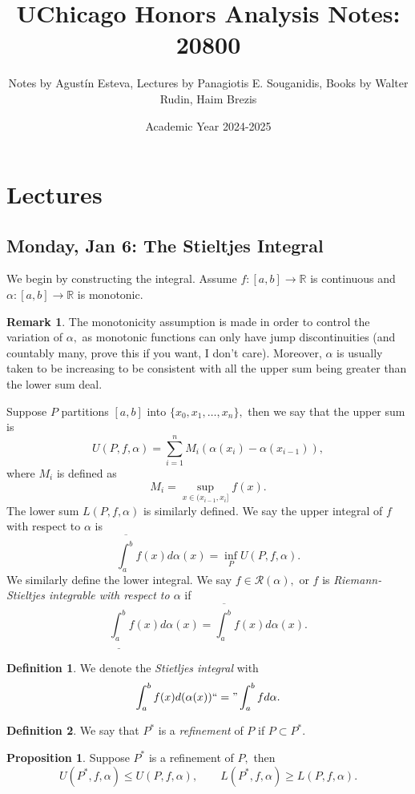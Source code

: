 \documentclass[10pt, oneside]{article}
\title{UChicago Honors Analysis Notes: 20800}
\author{Notes by Agustín Esteva, Lectures by Panagiotis E. Souganidis, Books by Walter Rudin, Haim Brezis}
\date{Academic Year 2024-2025}
\newcommand{\bbR}{\mathbb{R}}
\theoremstyle{definition}
\newtheorem{defn}{Definition}
\newtheorem{prop}{Proposition}
\newtheorem{rem}{Remark}
\begin{document}
\maketitle
\tableofcontents

\vspace{.25in}


\newpage
\section{Lectures}

\subsection{Monday, Jan 6: The Stieltjes Integral}
We begin by constructing the integral. Assume $f: [a,b]\to \bbR$ is continuous and $\alpha: [a,b]\to \bbR$ is monotonic. 
\begin{rem}
    The monotonicity assumption is made in order to control the variation of $\alpha,$ as monotonic functions can only have jump discontinuities (and countably many, prove this if you want, I don't care). Moreover, $\alpha$ is usually taken to be increasing to be consistent with all the upper sum being greater than the lower sum deal. 
\end{rem}
Suppose $P$ partitions $[a,b]$ into $\{x_0, x_1, \dots, x_n\},$ then we say that the upper sum is
\[U(P, f, \alpha) = \sum_{i=1}^n M_i (\alpha(x_i) - \alpha(x_{i-1})),\] where $M_i$ is defined as \[M_i = \sup_{x\in (x_{i-1}, x_i]}f(x).\] The lower sum $L(P, f, \alpha)$ is similarly defined. We say the upper integral of $f$ with respect to $\alpha$ is 
\[\overline{\int_a^b}f(x)d\alpha(x) = \inf_P  U(P, f, \alpha).\] We similarly define the lower integral.
We say $f\in \mathcal{R}(\alpha),$ or $f$ is \textit{Riemann-Stieltjes integrable with respect to $\alpha$} if 
\[\underline{\int_a^b}f(x)d\alpha(x) = \overline{\int_a^b}f(x)d\alpha(x).\]
\begin{defn}
    We denote the \textit{Stietljes integral} with
    \[\int_a^b f(x) d(\alpha(x)) ``=" \int_a^bf d\alpha.\]
\end{defn}
\begin{defn}
    We say that $P^\ast$ is a \textit{refinement} of $P$ if $P\subset P^\ast.$
\end{defn}
\begin{prop}
    Suppose $P^\ast$ is a refinement of $P,$ then 
    \[U(P^\ast, f, \alpha) \leq U(P, f, \alpha), \qquad L(P^\ast, f, \alpha) \geq L(P, f, \alpha).\]
\end{prop}
\end{document}
